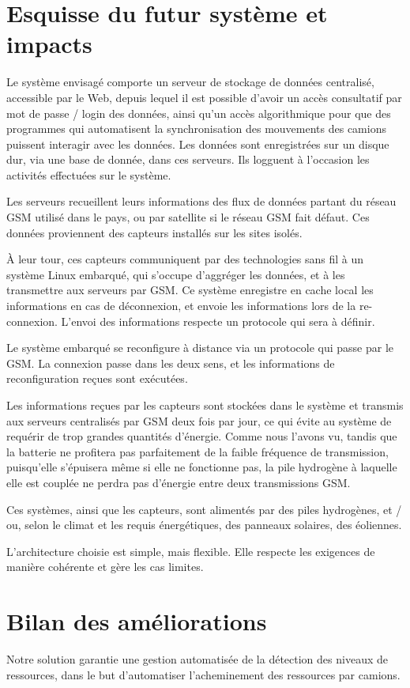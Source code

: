 \section{Esquisse du futur système et impacts}
Le système envisagé comporte un serveur de stockage de données centralisé, accessible par le Web, depuis lequel il est possible d’avoir un accès consultatif par mot de passe / login des données, ainsi qu’un accès algorithmique pour que des programmes qui automatisent la synchronisation des mouvements des camions puissent interagir avec les données. Les données sont enregistrées sur un disque dur, via une base de donnée, dans ces serveurs. Ils logguent à l’occasion les activités effectuées sur le système.

Les serveurs recueillent leurs informations des flux de données partant du réseau GSM utilisé dans le pays, ou par satellite si le réseau GSM fait défaut. Ces données proviennent des capteurs installés sur les sites isolés.

À leur tour, ces capteurs communiquent par des technologies sans fil à un système Linux embarqué, qui s’occupe d’aggréger les données, et à les transmettre aux serveurs par GSM. Ce système enregistre en cache local les informations en cas de déconnexion, et envoie les informations lors de la re-connexion. L’envoi des informations respecte un protocole qui sera à définir.

Le système embarqué se reconfigure à distance via un protocole qui passe par le GSM. La connexion passe dans les deux sens, et les informations de reconfiguration reçues sont exécutées.

Les informations reçues par les capteurs sont stockées dans le système et transmis aux serveurs centralisés par GSM deux fois par jour, ce qui évite au système de requérir de trop grandes quantités d’énergie. Comme nous l’avons vu, tandis que la batterie ne profitera pas parfaitement de la faible fréquence de transmission, puisqu’elle s’épuisera même si elle ne fonctionne pas, la pile hydrogène à laquelle elle est couplée ne perdra pas d’énergie entre deux transmissions GSM.

Ces systèmes, ainsi que les capteurs, sont alimentés par des piles hydrogènes, et / ou, selon le climat et les requis énergétiques, des panneaux solaires, des éoliennes.

L’architecture choisie est simple, mais flexible. Elle respecte les exigences de manière cohérente et gère les cas limites.

\section{Bilan des améliorations}
Notre solution garantie une gestion automatisée de la détection des niveaux de ressources, dans le but d’automatiser l’acheminement des ressources par camions.

